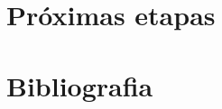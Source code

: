 \documentclass[a4paper,12pt,twoside]{article}
\begin{document}
\newpage
\section{Próximas etapas}





\newpage
\section{Bibliografia}





\end{document}
